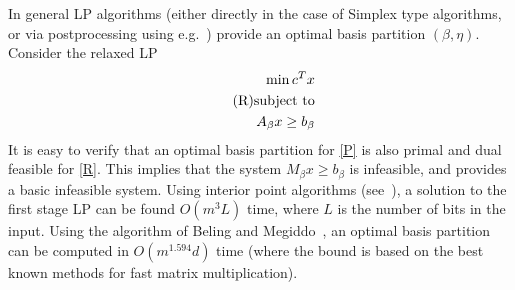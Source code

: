 \documentclass[12pt]{article}
\begin{document}
In general LP algorithms (either directly in the case of Simplex type
algorithms, or via postprocessing using
e.g.~\cite{megiddo91,vavasis96,BelingMegiddo98}) provide an optimal
basis partition $(\beta,\eta)$.  Consider the relaxed LP
\begin{align*}
  \min c^T x \\\tag{R}
  \eqlabel{R}
  \text{subject to}\\
  A_\beta x \geq b_\beta
\end{align*}
It is easy to verify that an optimal basis partition for \eqref{P}
is also primal and dual feasible for \eqref{R}.  This implies that
the system $M_\beta x \geq b_\beta$ is infeasible, and provides a
basic infeasible system.  Using interior point algorithms
(see~\cite{gonzaga87,renegar88,vaidya90,Roos89,RoosVial92}), a
solution to the first stage LP can be found $O(m^3L)$ time, where $L$
is the number of bits in the input.  Using the algorithm of Beling and
Megiddo~\cite{BelingMegiddo98}, an optimal basis partition can be
computed in $O(m^{1.594}d)$ time (where the bound is based on the best
known methods for fast matrix multiplication).
\end{document}
